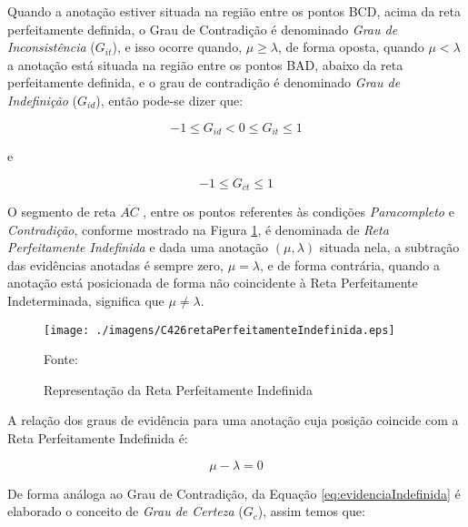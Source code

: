 Quando a anotação estiver situada na região entre os pontos BCD, acima da reta perfeitamente definida, o Grau de Contradição é denominado 
\emph{Grau de Inconsistência} ($G_{it}$), 
e isso ocorre quando, $\mu \ge \lambda $, de forma oposta, quando $\mu < \lambda $ a anotação está situada na região entre os pontos BAD, abaixo da reta perfeitamente definida, e o grau de contradição é denominado 
\emph{Grau de Indefinição} ($G_{id}$), 
então pode-se dizer que:

\begin{center}
\begin{equation}
-1 \le G _{id}  <  0 \le G _{it} \le 1
\label{eq:grauInconsistenciaIndefinicao}
\end{equation}
\end{center}
e
\begin{center}
\begin{equation}
-1 \le G _{ct} \le 1
\label{eq:grauInconsistenciaIndefinicao1}
\end{equation}
\end{center}


O segmento de reta $\overline{ AC }$ , entre os pontos referentes às condições \emph{Paracompleto} e \emph{Contradição}, conforme mostrado na Figura \ref{fig:retaPerfeitamenteIndefinida}, é denominada de \emph{Reta Perfeitamente Indefinida} e dada uma anotação $(\mu, \lambda )$ situada nela, a subtração das evidências anotadas é sempre zero, $\mu = \lambda$, e de forma contrária, quando a anotação está posicionada de forma não coincidente à Reta Perfeitamente Indeterminada, significa que $\mu \neq \lambda$.

\begin{figure}[!htb]
\caption{Representação da Reta Perfeitamente Indefinida}
\center\texttt{[image: ./imagens/C426retaPerfeitamenteIndefinida.eps]}
\label{fig:retaPerfeitamenteIndefinida}

{\small Fonte: \cite{JoaoInacio} }
\end{figure}

A relação dos graus de evidência para uma anotação cuja posição coincide com a Reta Perfeitamente Indefinida é: 

\begin{center}
\begin{equation}
\mu - \lambda = 0
\label{eq:evidenciaIndefinida}
\end{equation}
\end{center}

De forma análoga ao Grau de Contradição, da Equação \ref{eq:evidenciaIndefinida} é elaborado o conceito de \emph{Grau de Certeza} ($G _c$), assim temos que: 

